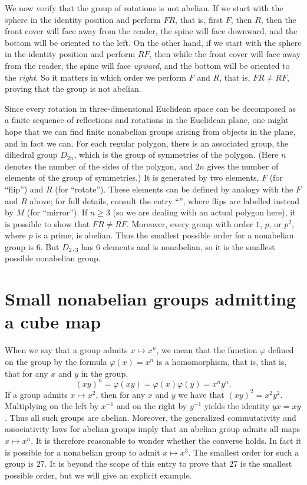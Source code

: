 \documentclass[12pt]{article}
\newcounter{123listctr}
\newcounter{123listcolonstylectr}
\begin{document}
We now verify that the group of rotations is not abelian.  If we start
with the sphere in the identity position and perform $FR$, that is,
first $F$, then $R$, then the front cover will face away from the
reader, the spine will face downward, and the bottom will be oriented
to the left.  On the other hand, if we start with the sphere in the
identity position and perform $RF$, then while the front cover will
face away from the reader, the spine will face \emph{upward}, and the
bottom will be oriented to the \emph{right}.  So it matters in which
order we perform $F$ and $R$, that is, $FR \ne RF$, proving that the
group is not abelian.

Since every rotation in three-dimensional Euclidean space can be
decomposed as a finite sequence of reflections and rotations in the
Euclidean plane, one might hope that we can find finite nonabelian
groups arising from objects in the plane, and in fact we can.  For
each regular polygon, there is an associated group, the dihedral group
$D_{2n}$, which is the group of symmetries of the polygon.  (Here $n$
denotes the number of the sides of the polygon, and $2n$ gives the
number of elements of the group of symmetries.)  It is generated by
two elements, $F$ (for ``flip'') and $R$ (for ``rotate'').  These
elements can be defined by analogy with the $F$ and $R$ above; for
full details, consult the entry ``'', where flips are labelled instead by $M$ (for
``mirror'').  If $n\ge 3$ (so we are dealing with an actual polygon
here), it is possible to show that $FR \ne RF$.  Moreover, every group
with order $1$, $p$, or $p^2$, where $p$ is a prime, is abelian.  Thus
the smallest possible order for a nonabelian group is $6$.  But
$D_{2\cdot 3}$ has $6$ elements and is nonabelian, so it is the
smallest possible nonabelian group.

\section{Small nonabelian groups admitting a cube map}

When we say that a group admits $x\mapsto x^n$, we mean that the
function $\varphi$ defined on the group by the formula $\varphi(x) =
x^n$ is a homomorphism, that is, that is, that for any $x$ and $y$ in
the group,
\[
  (xy)^n = \varphi(xy) = \varphi(x)\varphi(y) = x^ny^n.  
\]
If a group admits $x\mapsto x^2$, then for any $x$ and $y$ we have
that $(xy)^2 = x^2y^2$.  Multiplying on the left by $x^{-1}$ and on
the right by $y^{-1}$ yields the identity $yx = xy$.  Thus all such
groups are abelian.  Moreover, the generalized commutativity and
associativity laws for abelian groups imply that an abelian group
admits all maps $x\mapsto x^n$.  It is therefore reasonable to wonder
whether the converse holds.  In fact it is possible for a nonabelian
group to admit $x\mapsto x^3$.  The smallest order for such a group is
$27$.  It is %
beyond the scope of this entry to prove that $27$ is the smallest 
possible order, but we will give an explicit example.  
\end{document}
